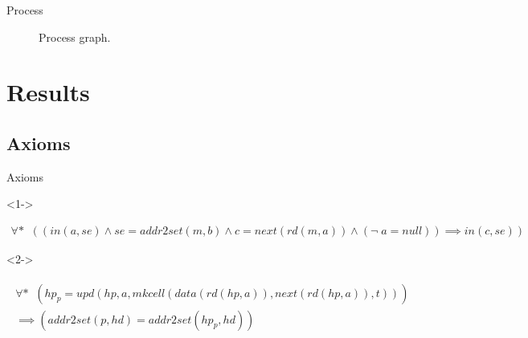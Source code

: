 \documentclass[10pt,notes,compress,usetitleprogressbar,aspectratio=1610]{beamer}
\begin{document}
\begin{frame}{Process}

	\begin{figure}
		\caption{Process graph.}
		\label{fig:process}
	\end{figure}

\end{frame}

\section{Results}

\subsection{Axioms}
\begin{frame}{Axioms}

	\begin{block}<1->{}
		\begin{axiomdescription}[nextreg]
			\label{ax::nextreg}
			\begin{align*}
				\forall \ast \;\; ((in(a,se) \wedge se = addr2set(m,b) \wedge c = next(rd(m,a)) \wedge (\neg\;  a = null))\implies in(c,se))
			\end{align*}
		\end{axiomdescription}
	\end{block}
	\begin{block}<2->{}
		\begin{axiomdescription}
			\label{ax::lock_keeps_addr2set}
			\begin{align*}
				\begin{array}{r}
				\forall \ast \;\; (hp_p = upd(hp,a,mkcell(data(rd(hp,a)),next(rd(hp,a)),t))) 
				\\
				\implies (addr2set(p,hd) = addr2set(hp_p,hd))
				\end{array}
			\end{align*}
		\end{axiomdescription}
	\end{block}

\end{frame}
\end{document}
